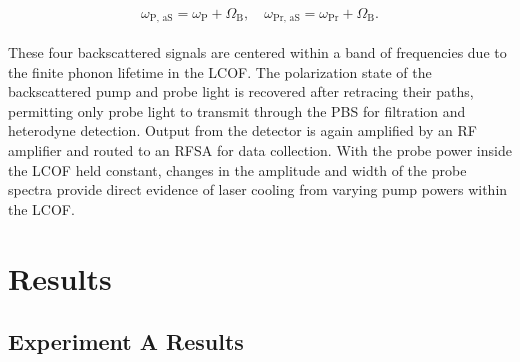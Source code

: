 \begin{equation}
\omega_{\mathrm{P,\,aS}} = \omega_{\mathrm{P}} + \Omega_{\mathrm{B}},
\quad
\omega_{\mathrm{Pr,\,aS}} = \omega_{\mathrm{Pr}} + \Omega_{\mathrm{B}}.
\end{equation}
\\
These four backscattered signals are centered within a band of frequencies due to the finite phonon lifetime in the \ac{LCOF}. The polarization state of the backscattered pump and probe light is recovered after retracing their paths, permitting only probe light to transmit through the \ac{PBS} for filtration and heterodyne detection. Output from the detector is again amplified by an \ac{RF} amplifier and routed to an \ac{RFSA} for data collection. With the probe power inside the \ac{LCOF} held constant, changes in the amplitude and width of the probe spectra provide direct evidence of laser cooling from varying pump powers within the \ac{LCOF}.


\section{Results}
\label{Cooling:sec:Results}


\subsection{Experiment A Results}
\label{Cooling:subsec:ExperimentAResults}

